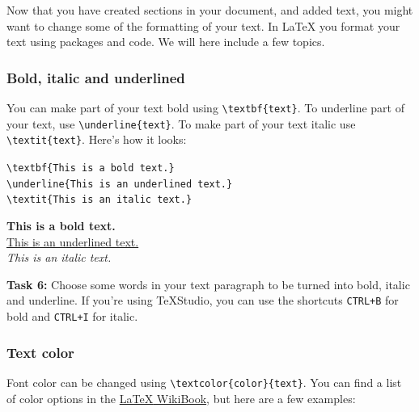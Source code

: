 \documentclass[12pts]{article}
\begin{document}
	Now that you have created sections in your document, and added text, you might want to change some of the formatting of your text. In {\LaTeX} you format your text using packages and code. We will here include a few topics.
	
	\subsubsection{Bold, italic and underlined}
	
	You can make part of your text bold using \verb|\textbf{text}|. To 	underline part of your text, use \verb|\underline{text}|. To make part of your text italic use \verb|\textit{text}|. Here's how it looks:
	
	\begin{center}
		\begin{multicols}{2}
			\verb|\textbf{This is a bold text.}| \\
			\verb|\underline{This is an underlined text.}| \\
			\verb|\textit{This is an italic text.}| \\
			
			\columnbreak
			
			\textbf{This is a bold text.} \\
			\underline{This is an underlined text.} \\
			\textit{This is an italic text.}
		\end{multicols}
	\end{center}
	
	\textcolor{BurntOrange}{\textbf{Task 6:}} Choose some words in your text paragraph to be turned into bold, italic and underline. If you're using TeXStudio, you can use the shortcuts \texttt{CTRL+B} for bold and \texttt{CTRL+I} for italic.
	
	\subsubsection{Text color}
	Font color can be changed using \verb|\textcolor{color}{text}|. You can find a list of color options in the \href{https://en.wikibooks.org/wiki/LaTeX/Colors}{{\LaTeX} WikiBook}, but here are a few examples:

	
\end{document}
